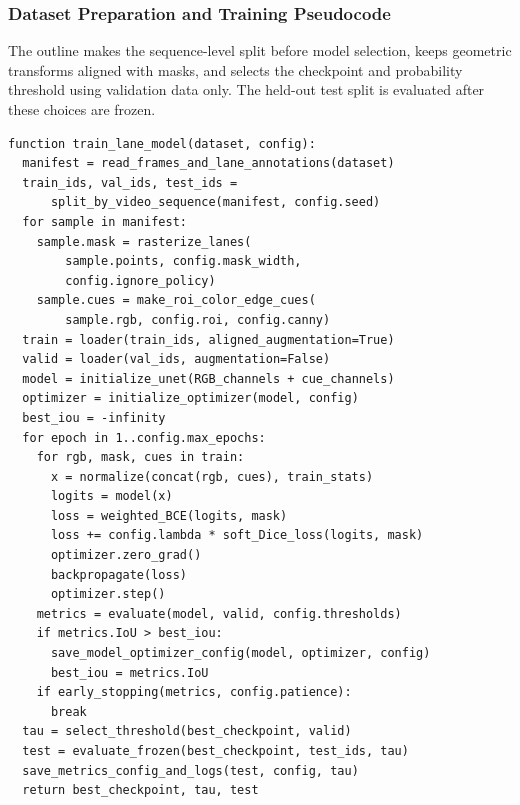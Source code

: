 \documentclass[10pt,a4paper,twocolumn]{article}
\begin{document}
\subsubsection*{Dataset Preparation and Training Pseudocode}
The outline makes the sequence-level split before model selection, keeps geometric transforms aligned with masks, and selects the checkpoint and probability threshold using validation data only. The held-out test split is evaluated after these choices are frozen.

\begin{lstlisting}
function train_lane_model(dataset, config):
  manifest = read_frames_and_lane_annotations(dataset)
  train_ids, val_ids, test_ids =
      split_by_video_sequence(manifest, config.seed)
  for sample in manifest:
    sample.mask = rasterize_lanes(
        sample.points, config.mask_width,
        config.ignore_policy)
    sample.cues = make_roi_color_edge_cues(
        sample.rgb, config.roi, config.canny)
  train = loader(train_ids, aligned_augmentation=True)
  valid = loader(val_ids, augmentation=False)
  model = initialize_unet(RGB_channels + cue_channels)
  optimizer = initialize_optimizer(model, config)
  best_iou = -infinity
  for epoch in 1..config.max_epochs:
    for rgb, mask, cues in train:
      x = normalize(concat(rgb, cues), train_stats)
      logits = model(x)
      loss = weighted_BCE(logits, mask)
      loss += config.lambda * soft_Dice_loss(logits, mask)
      optimizer.zero_grad()
      backpropagate(loss)
      optimizer.step()
    metrics = evaluate(model, valid, config.thresholds)
    if metrics.IoU > best_iou:
      save_model_optimizer_config(model, optimizer, config)
      best_iou = metrics.IoU
    if early_stopping(metrics, config.patience):
      break
  tau = select_threshold(best_checkpoint, valid)
  test = evaluate_frozen(best_checkpoint, test_ids, tau)
  save_metrics_config_and_logs(test, config, tau)
  return best_checkpoint, tau, test
\end{lstlisting}
\end{document}
